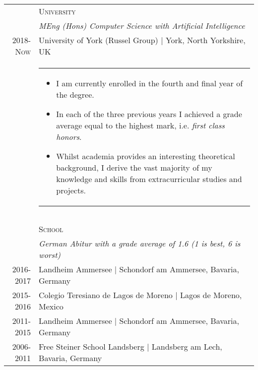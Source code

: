 \documentclass[a4paper,10pt]{article}
\begin{document}
\begin{longtable}{r|p{12cm}}

                    & \textsc{University} \\
                    & \emph{MEng (Hons) Computer Science with Artificial
                      Intelligence} \\
\textsc{2018-Now}   & University of York (Russel Group) | York, North Yorkshire, UK \\
                    & \begin{tabular}{p{}}
                        \vspace{-2mm}
                        \begin{itemize}[leftmargin=*]

                            \item I am currently enrolled in the fourth and
                                final year of the degree.

                            \item In each of the three previous years I achieved
                                a grade average equal to the highest mark, i.e.
                                \emph{first class honors}.

                            \item Whilst academia provides an interesting
                                theoretical background, I derive the vast
                                majority of my knowledge and skills from
                                extracurricular studies and projects.

                        \vspace{-4mm}
                        \end{itemize}
                      \end{tabular} \\
\multicolumn{2}{c}{}\\
\multicolumn{2}{c}{}\\

                    & \textsc{School} \\
                    & \emph{German \emph{Abitur} with a grade average of 1.6 (1
                    is best, 6 is worst)} \\
\textsc{2016-2017}  & Landheim Ammersee | Schondorf am Ammersee, Bavaria, Germany \\
\textsc{2015-2016}  & Colegio Teresiano de Lagos de Moreno | Lagos de Moreno, Mexico \\
\textsc{2011-2015}  & Landheim Ammersee | Schondorf am Ammersee, Bavaria, Germany \\
\textsc{2006-2011}  & Free Steiner School Landsberg | Landsberg am Lech, Bavaria, Germany \\

\end{longtable}
\end{document}
